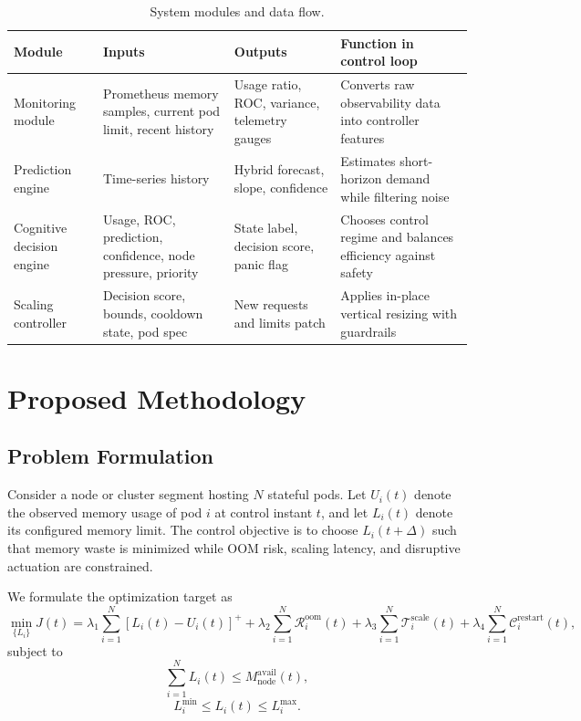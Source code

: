 \documentclass[12pt,a4paper]{article}
\begin{document}
\begin{table}[t]
\centering
\caption{System modules and data flow.}
\label{tab:architecture_modules}
\begin{tabularx}{\textwidth}{L{3cm}L{3.2cm}L{3.3cm}Y}
\toprule
\textbf{Module} & \textbf{Inputs} & \textbf{Outputs} & \textbf{Function in control loop} \\
\midrule
Monitoring module & Prometheus memory samples, current pod limit, recent history & Usage ratio, ROC, variance, telemetry gauges & Converts raw observability data into controller features \\
Prediction engine & Time-series history & Hybrid forecast, slope, confidence & Estimates short-horizon demand while filtering noise \\
Cognitive decision engine & Usage, ROC, prediction, confidence, node pressure, priority & State label, decision score, panic flag & Chooses control regime and balances efficiency against safety \\
Scaling controller & Decision score, bounds, cooldown state, pod spec & New requests and limits patch & Applies in-place vertical resizing with guardrails \\
\bottomrule
\end{tabularx}
\end{table}

\section{Proposed Methodology}
\label{sec:methodology}

\subsection{Problem Formulation}

Consider a node or cluster segment hosting $N$ stateful pods. Let $U_i(t)$ denote the observed memory usage of pod $i$ at control instant $t$, and let $L_i(t)$ denote its configured memory limit. The control objective is to choose $L_i(t+\Delta)$ such that memory waste is minimized while OOM risk, scaling latency, and disruptive actuation are constrained.

We formulate the optimization target as
\begin{equation}
\label{eq:objective}
\min_{\{L_i\}} J(t) = \lambda_1 \sum_{i=1}^{N} [L_i(t)-U_i(t)]^{+}
+ \lambda_2 \sum_{i=1}^{N} \mathcal{R}^{\text{oom}}_i(t)
+ \lambda_3 \sum_{i=1}^{N} \mathcal{T}^{\text{scale}}_i(t)
+ \lambda_4 \sum_{i=1}^{N} \mathcal{C}^{\text{restart}}_i(t),
\end{equation}
subject to
\begin{equation}
\label{eq:constraint1}
\sum_{i=1}^{N} L_i(t) \leq M^{\text{avail}}_{\text{node}}(t),
\end{equation}
\begin{equation}
\label{eq:constraint2}
L_i^{\min} \leq L_i(t) \leq L_i^{\max}.
\end{equation}
\end{document}
